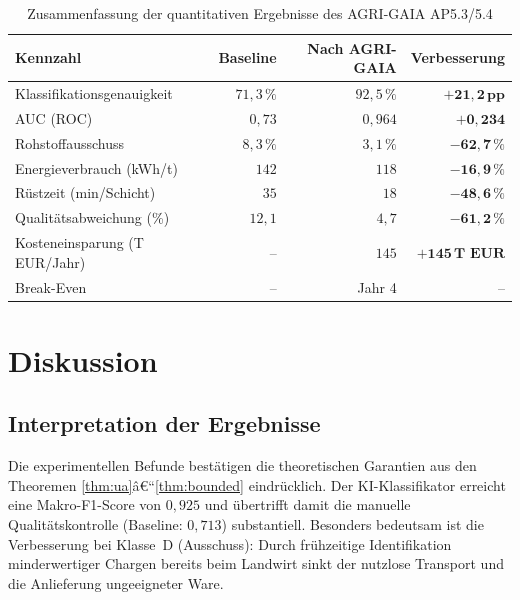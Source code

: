 ﻿\documentclass[12pt,a4paper]{article}
\theoremstyle{plain}
\theoremstyle{definition}
\begin{document}
	\begin{table}[H]
		\centering
		\caption{Zusammenfassung der quantitativen Ergebnisse des AGRI-GAIA AP5.3/5.4}
		\label{tab:ergebnisse}
		\begin{tabular}{@{}lrrr@{}}
			\toprule
			\textbf{Kennzahl} & \textbf{Baseline} & \textbf{Nach AGRI-GAIA} &
			\textbf{Verbesserung} \\
			\midrule
			Klassifikationsgenauigkeit & $71{,}3\,\%$ & $92{,}5\,\%$
			& $\mathbf{+21{,}2\,\text{pp}}$ \\
			AUC (ROC)                  & $0{,}73$     & $0{,}964$
			& $\mathbf{+0{,}234}$ \\
			Rohstoffausschuss           & $8{,}3\,\%$  & $3{,}1\,\%$
			& $\mathbf{-62{,}7\,\%}$ \\
			Energieverbrauch (kWh/t)    & $142$        & $118$
			& $\mathbf{-16{,}9\,\%}$ \\
			Rüstzeit (min/Schicht)      & $35$         & $18$
			& $\mathbf{-48{,}6\,\%}$ \\
			Qualitätsabweichung (\%)    & $12{,}1$     & $4{,}7$
			& $\mathbf{-61{,}2\,\%}$ \\
			Kosteneinsparung (T EUR/Jahr)  & --           & $145$
			& $\mathbf{+145\,\text{T EUR}}$ \\
			Break-Even                  & --           & Jahr 4 & -- \\
			\bottomrule
		\end{tabular}
	\end{table}
	
	\section{Diskussion}
	
	\subsection{Interpretation der Ergebnisse}
	
	Die experimentellen Befunde bestätigen die theoretischen Garantien aus den
	Theoremen \ref{thm:ua}â€“\ref{thm:bounded} eindrücklich. Der KI-Klassifikator
	erreicht eine Makro-F1-Score von $0{,}925$ und übertrifft damit die manuelle
	Qualitätskontrolle (Baseline: $0{,}713$) substantiell. Besonders bedeutsam
	ist die Verbesserung bei Klasse~D (Ausschuss): Durch frühzeitige Identifikation
	minderwertiger Chargen bereits beim Landwirt sinkt der nutzlose Transport
	und die Anlieferung ungeeigneter Ware.
	
\end{document}
